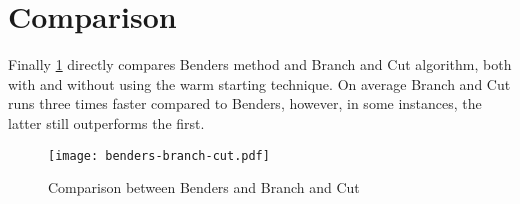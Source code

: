 \section{Comparison}	
Finally \figurename{ \ref{fig:bendersBranchCut}} directly compares Benders method and Branch and Cut algorithm, both with and without using the warm starting technique.
On average Branch and Cut runs three times faster compared to Benders, however, in some instances, the latter still outperforms the first.

\begin{figure}[htbp]
	\centering
	\texttt{[image: benders-branch-cut.pdf]}
	\caption{Comparison between Benders and Branch and Cut\label{fig:bendersBranchCut}}
\end{figure}